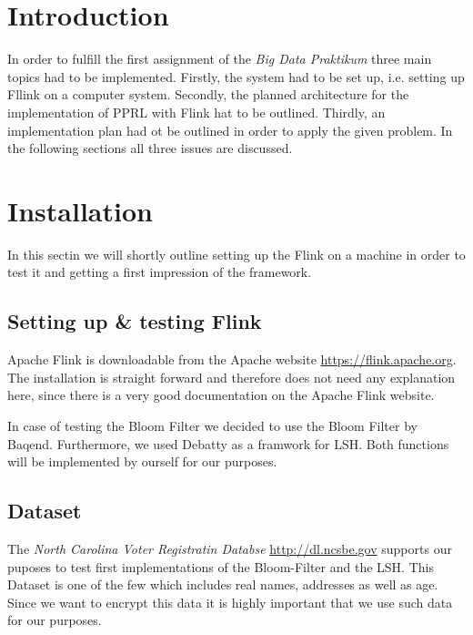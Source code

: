 \documentclass[10pt]{article}
\begin{document}
    

    \section{Introduction}

        In order to fulfill the first assignment of the \textit{Big Data Praktikum} three main topics had to be
        implemented. Firstly, the system had to be set up, i.e. setting up Fllink on a computer system. Secondly,
        the planned architecture for the implementation of PPRL with Flink hat to be outlined. Thirdly, an
        implementation plan had ot be outlined in order to apply the given problem.
        In the following sections all three issues are discussed.

    \section{Installation}

        In this sectin we will shortly outline setting up the Flink on a machine in order to test it and
        getting a first impression of the framework.

        \subsection{Setting up \& testing Flink}

            Apache Flink is downloadable from the Apache website \url{https://flink.apache.org}. The installation
            is straight forward and therefore does not need any explanation here, since there is a very good
            documentation on the Apache Flink website.

            In case of testing the Bloom Filter we decided to use the Bloom Filter by Baqend. Furthermore,
            we used Debatty as a framwork for LSH. Both functions will be implemented by ourself for our
            purposes.

        \subsection{Dataset}


            The \textit{North Carolina Voter Registratin Databse} \url{http://dl.ncsbe.gov}
            supports our puposes to test
            first implementations of the Bloom-Filter and the LSH. This Dataset is one of the few
            which includes real names, addresses as well as age. Since we want to encrypt this data
            it is highly important that we use such data for our purposes.
\end{document}
